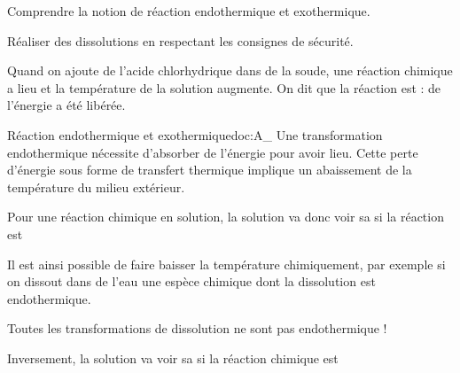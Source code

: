 \teteSndChim

\vspace*{-28pt}

\begin{objectifs}
  \item Comprendre la notion de réaction endothermique et exothermique.
  \item Réaliser des dissolutions en respectant les consignes de sécurité.
\end{objectifs}

\begin{contexte}
  Quand on ajoute de l'acide chlorhydrique dans de la soude, une réaction chimique a lieu et la température de la solution augmente.
  On dit que la réaction est  : de l'énergie a été libérée.
  
\end{contexte}


\begin{doc}{Réaction endothermique et exothermique}{doc:A_}
  Une transformation endothermique nécessite d'absorber de l'énergie pour avoir lieu.
  Cette perte d'énergie sous forme de transfert thermique implique un abaissement de la température du milieu extérieur.
  
  \begin{importants}
    Pour une réaction chimique en solution, la solution va donc voir sa  si la réaction est 
  \end{importants}
  
  Il est ainsi possible de faire baisser la température chimiquement, par exemple si on dissout dans de l'eau une espèce chimique dont la dissolution est endothermique.
  
  \attention Toutes les transformations de dissolution ne sont pas endothermique !
  
  \begin{importants}
    Inversement, la solution va voir sa  si la réaction chimique est 
  \end{importants}
\end{doc}

